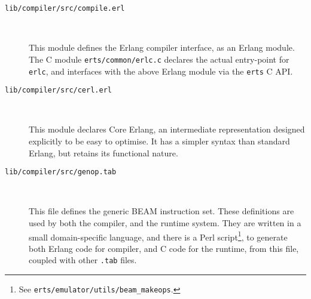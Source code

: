\begin{description}

\item[\texttt{lib/compiler/src/compile.erl}]~

This module defines the Erlang compiler interface, as an Erlang
module. The C module \texttt{erts/common/erlc.c} declares the actual
entry-point for \texttt{erlc}, and interfaces with the above Erlang
module via the \texttt{erts} C API.

\item[\texttt{lib/compiler/src/cerl.erl}]~

This module declares Core Erlang, an intermediate representation
designed explicitly to be easy to optimise. It has a simpler syntax
than standard Erlang, but retains its functional nature.

\item[\texttt{lib/compiler/src/genop.tab}]~

This file defines the generic BEAM instruction set. These definitions
are used by both the compiler, and the runtime system. They are
written in a small domain-specific language, and there is a Perl
script\footnote{See \texttt{erts/emulator/utils/beam\_makeops}.}, to
generate both Erlang code for compiler, and C code for the runtime,
from this file, coupled with other \texttt{.tab} files.

\end{description}
